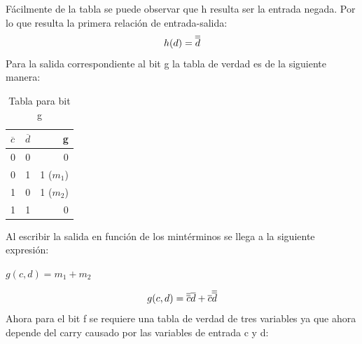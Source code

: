 Fácilmente de la tabla se puede observar que h resulta ser la entrada negada. Por lo que resulta la primera relación de entrada-salida:\\
\begin{equation}
	\centerline{$h(d)=\overline{\overline{d}}$}
\end{equation}
Para la salida correspondiente al bit g la tabla de verdad es de la siguiente manera:
\begin{table}[H]
	\begin{center}
		\caption{Tabla para bit g}
		\vspace{5mm}
		\begin{tabular}{l|c|r}
			\textbf{$\overline{c}$} & \textbf{$\overline{d}$} & \textbf{g}  \\
			\hline
			0                       & 0                       & 0           \\
			0                       & 1                       & 1 ($m_{1}$) \\	
			1                       & 0                       & 1 ($m_{2}$) \\
			1                       & 1                       & 0           \\			
		\end{tabular}
	\end{center}
\end{table}	
Al escribir la salida en función de los mintérminos se llega a la siguiente expresión:\\
\centerline{$g(c,d)=m_{1}+m_{2}$}
\begin{equation}
	\centerline{$g(c,d)=\overline{\overline{c}}\overline{d}+\overline{c}\overline{\overline{d}}$}
\end{equation}
Ahora para el bit f se requiere una tabla de verdad de tres variables ya que ahora depende del carry causado por las variables de entrada c y d:\\
